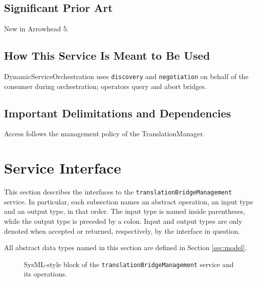 \documentclass[a4paper]{arrowhead}
\begin{document}
\subsection{Significant Prior Art}

New in Arrowhead 5.

\subsection{How This Service Is Meant to Be Used}

Dynamic\allowbreak{}Service\allowbreak{}Orchestration uses \texttt{discovery} and \texttt{negotiation} on behalf of the consumer during orchestration; operators query and abort bridges.

\subsection{Important Delimitations and Dependencies}
\label{sec:delimitations}

Access follows the management policy of the Translation\allowbreak{}Manager.

\newpage

\section{Service Interface}
\label{sec:operations}

This section describes the interfaces to the \texttt{translation\allowbreak{}Bridge\allowbreak{}Management} service.
In particular, each subsection names an abstract operation, an input type and an output type, in that order.
The input type is named inside parentheses, while the output type is preceded by a colon.
Input and output types are only denoted when accepted or returned, respectively, by the interface in question.

All abstract data types named in this section are defined in Section \ref{sec:model}.

\begin{figure}[ht!]
  \centering
  \caption{SysML-style block of the \texttt{translation\allowbreak{}Bridge\allowbreak{}Management} service and its operations.}
  \label{fig:SD}
\end{figure}
\end{document}
